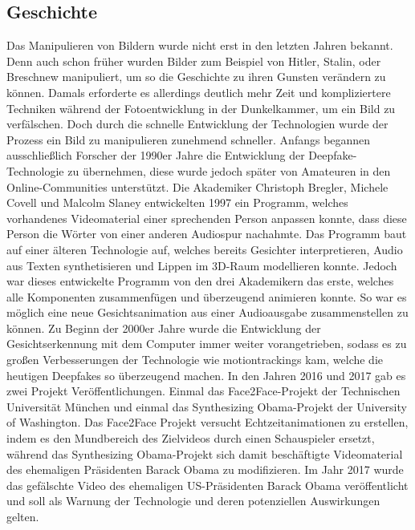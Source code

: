 \subsection{Geschichte}
Das Manipulieren von Bildern wurde nicht erst in den letzten Jahren bekannt. Denn auch schon früher wurden Bilder zum Beispiel von Hitler, Stalin, oder Breschnew manipuliert, um so die Geschichte zu ihren Gunsten verändern zu können.
Damals erforderte es allerdings deutlich mehr Zeit und kompliziertere Techniken während der Fotoentwicklung in der Dunkelkammer, um ein Bild zu verfälschen. Doch durch die schnelle Entwicklung der Technologien wurde der Prozess ein Bild zu manipulieren zunehmend schneller.
Anfangs begannen ausschließlich Forscher der 1990er Jahre die Entwicklung der Deepfake-Technologie zu übernehmen, diese wurde jedoch später von Amateuren in den Online-Communities unterstützt.
Die Akademiker Christoph Bregler, Michele Covell und Malcolm Slaney entwickelten 1997 ein Programm, welches vorhandenes Videomaterial einer sprechenden Person anpassen konnte, dass diese Person die Wörter von einer anderen Audiospur nachahmte.
Das Programm baut auf einer älteren Technologie auf, welches bereits Gesichter interpretieren, Audio aus Texten synthetisieren und Lippen im 3D-Raum modellieren konnte.
Jedoch war dieses entwickelte Programm von den drei Akademikern das erste, welches alle Komponenten zusammenfügen und überzeugend animieren konnte. So war es möglich eine neue Gesichtsanimation aus einer Audioausgabe zusammenstellen zu können.\newline
Zu Beginn der 2000er Jahre wurde die Entwicklung der Gesichtserkennung mit dem Computer immer weiter vorangetrieben, sodass es zu großen Verbesserungen der Technologie wie \glspl{motiontracking} kam, welche die heutigen Deepfakes so überzeugend machen.\newline
In den Jahren 2016 und 2017 gab es zwei Projekt Veröffentlichungen. Einmal das Face2Face-Projekt der Technischen Universität München und einmal das Synthesizing Obama-Projekt der University of Washington. \newline
Das Face2Face Projekt versucht Echtzeitanimationen zu erstellen, indem es den Mundbereich des Zielvideos durch einen Schauspieler ersetzt, während das Synthesizing Obama-Projekt sich damit beschäftigte Videomaterial des ehemaligen Präsidenten Barack Obama zu modifizieren.\cite{ResearchGate}\newline
Im Jahr 2017 wurde das gefälschte Video des ehemaligen US-Präsidenten Barack Obama veröffentlicht und soll als Warnung der Technologie und deren potenziellen Auswirkungen gelten.
